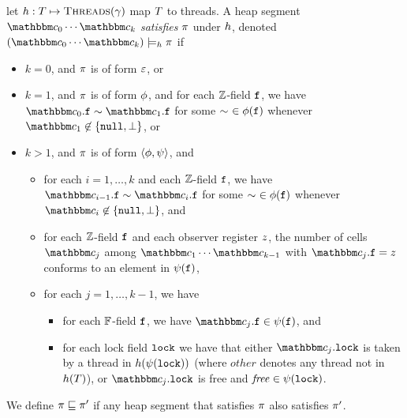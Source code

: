 let $h:T \mapsto \mbox{\sc Threads}(\gamma)$ map $T$ to threads.
A heap segment $\cell_0 \cdots \cell_k$ %
{\em satisfies} $\pi$ under $h$, denoted
$(\cell_0 \cdots \cell_k) \models_{\thmap} \pathexp$ if
\vspace{-2mm}
\begin{itemize}
\item $k = 0$, and $\pi$ is of form $\varepsilon$, or
\item $k = 1$, and $\pi$ is of form $\phi$, and for
  each ${\mathbb Z}$-field $\mathtt{f}$, we have
  $\cell_0.\zfield \sim \cell_1.\zfield$ for some $\sim \ \in \phi(\mathtt{f})$ whenever $\cell_1 \not \in \set{\nullconst,\bot}$,
  or
\item $k > 1$, and $\pi$ is of form $\left\langle\phi,\psi\right\rangle$, and
\begin{itemize}
\item
  for each $i = 1,\ldots,k$ and
  each ${\mathbb Z}$-field $\mathtt{f}$,
  we have $\cell_{i-1}.\zfield \sim \cell_i.\zfield$
  for some $\sim \ \in \phi(\mathtt{f})$
  whenever $\cell_i \not \in \set{\nullconst,\bot}$, and
\item
  for each ${\mathbb Z}$-field $\mathtt{f}$ and each
  observer register $z$, the number of cells $\cell_j$ among
  $\cell_1 \cdots \cell_{k-1}$ with $\cell_j.\zfield = \ovar$ conforms to
  an element in $\psi(\mathtt{f})$,
\item 
  for each $j = 1,\ldots,k-1$, we have
\begin{itemize}
\item  for each $\mathbb{F}$-field $\mathtt{f}$, we have
  $\cell_j.\ffield \in \fpathexpr(\ffield)$, and
\item
  for each lock field $\mathtt{lock}$
  we have that either $\cell_j.\lfield$ is taken by a thread in
  $h(\psi(\mathtt{lock}))$
  (where $\mathit{other}$ denotes any thread not in
  $h(T)$), or $\cell_j.\lfield$ is free and
  $\mathit{free} \in \psi(\mathtt{lock})$.
\end{itemize}
\end{itemize}
\end{itemize}
\vspace{-2mm}
We define $\pi \sqsubseteq \pi'$ if any heap segment that satisfies
$\pi$ also satisfies $\pi'$. 





